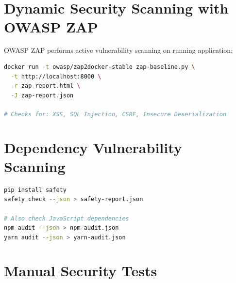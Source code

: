 \documentclass{report}
\begin{document}
\section{Dynamic Security Scanning with OWASP ZAP}

OWASP ZAP performs active vulnerability scanning on running application:

\begin{lstlisting}[language=bash, caption=OWASP ZAP baseline scan in CI]
docker run -t owasp/zap2docker-stable zap-baseline.py \
  -t http://localhost:8000 \
  -r zap-report.html \
  -J zap-report.json

# Checks for: XSS, SQL Injection, CSRF, Insecure Deserialization
\end{lstlisting}

\section{Dependency Vulnerability Scanning}

\begin{lstlisting}[language=bash, caption=Python dependency security check]
pip install safety
safety check --json > safety-report.json

# Also check JavaScript dependencies
npm audit --json > npm-audit.json
yarn audit --json > yarn-audit.json
\end{lstlisting}

\section{Manual Security Tests}
\end{document}
